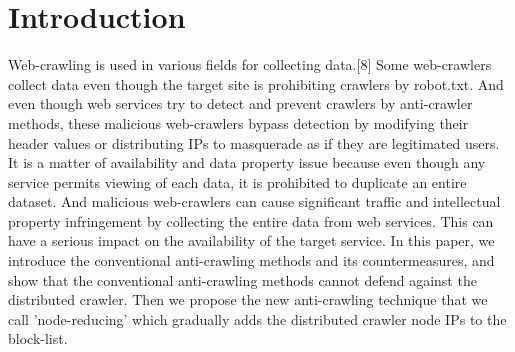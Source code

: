 \documentclass[sigconf,anonymous=true]{acmart}
\begin{document}

\maketitle


%
%
\section{Introduction}
Web-crawling is used in various fields for collecting data.[8] Some web-crawlers collect data even though the target site is prohibiting crawlers by robot.txt. And even though web services try to detect and prevent crawlers by anti-crawler methods, these malicious web-crawlers bypass detection by modifying their header values or distributing IPs to masquerade as if they are legitimated users.
It is a matter of availability and data property issue because even though any service permits viewing of each data, it is prohibited to duplicate an entire dataset. And malicious web-crawlers can cause significant traffic and intellectual property infringement by collecting the entire data from web services. This can have a serious impact on the availability of the target service.
In this paper, we introduce the conventional anti-crawling methods and its countermeasures, and show that the conventional anti-crawling methods cannot defend against the distributed crawler. Then we propose the new anti-crawling technique that we call 'node-reducing' which gradually adds the distributed crawler node IPs to the block-list.

%
%
\end{document}
